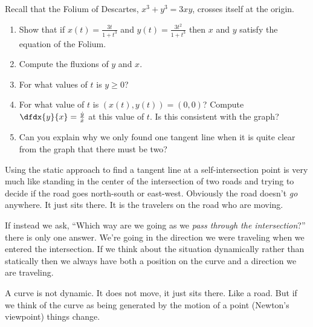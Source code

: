 
\begin{embeddedproblem}
  \label{problem:FoliumOfDescartes1}
  Recall that the Folium of Descartes, $x^3+y^3=3xy$,  crosses itself at the origin.
  \begin{enumerate}[label={\bf{}(\alph*)}]
  \item Show that if $ x(t)=\frac{3t}{1+t^3}$ and
    $ y(t)=\frac{3t^2}{1+t^3}$ then $x$ and $y$ satisfy the equation
    of the Folium.
  \item Compute the fluxions of $y$ and $x$.
  \item For what values of $t$ is $y\ge0$?
  \item For what value of $t$ is $(x(t), y(t)) = (0,0)$? Compute
    $\dfdx{y}{x}=\frac{\dot{y}}{\dot{x}}$ at this value of $t$. Is
    this consistent with the graph?
  \item Can you explain why we only found one tangent line when it
    is quite clear from the graph that there must be two? 
  \end{enumerate}
\end{embeddedproblem}

Using the static approach to find a tangent line at a
self-intersection point is very much like standing in the center of
the  intersection of two roads and trying to decide if the road goes
north-south or east-west. Obviously the road doesn't \emph{go}
anywhere. It just sits there. It is the travelers on the road who are
moving.

If instead we ask, ``Which way are we going as we
  \emph{pass through the intersection}?'' there is only one answer. We're
going in the direction we were traveling when we entered the
intersection.  If we think about the situation dynamically rather than
statically then we always have both a position on the curve and a
direction we are traveling.

A curve is not dynamic. It does not move, it just sits there. Like a
road. But if we think of the curve as being generated by the motion of
a point (Newton's viewpoint) things change.

